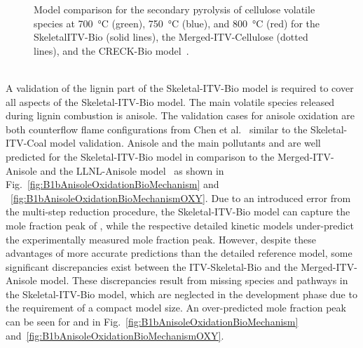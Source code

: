 \begin{refsection}
\begin{figure}[h]
  \hfill
  \hfill
  \caption{Model comparison for the secondary pyrolysis of cellulose volatile species at \SI{700}{\celsius} (green), \SI{750}{\celsius} (blue), and \SI{800}{\celsius} (red) for the SkeletalITV-Bio (solid lines), the Merged-ITV-Cellulose (dotted lines), and the CRECK-Bio model~\cite{Debiagi2016}.}
  \label{fig:B1bCellulosePyrolysisBioMechanism}
\end{figure}
\\
A validation of the lignin part of the Skeletal-ITV-Bio model is required to cover all aspects of the Skeletal-ITV-Bio model. The main volatile species released during lignin combustion is anisole. The validation cases for anisole oxidation are both counterflow flame configurations from Chen et al.~\cite{Chen2022} similar to the Skeletal-ITV-Coal model validation. Anisole and the main pollutants  and  are well predicted for the Skeletal-ITV-Bio model in comparison to the Merged-ITV-Anisole and the LLNL-Anisole model~\cite{Wagnon2018} as shown in Fig.~\ref{fig:B1bAnisoleOxidationBioMechanism} and ~\ref{fig:B1bAnisoleOxidationBioMechanismOXY}. Due to an introduced error from the multi-step reduction procedure, the Skeletal-ITV-Bio model can capture the mole fraction peak of , while the respective detailed kinetic models under-predict the experimentally measured mole fraction peak. However, despite these advantages of more accurate predictions than the detailed reference model, some significant discrepancies exist between the ITV-Skeletal-Bio and the Merged-ITV-Anisole model. These discrepancies result from missing species and pathways in the Skeletal-ITV-Bio model, which are neglected in the development phase due to the requirement of a compact model size. An over-predicted mole fraction peak can be seen for  and  in Fig.~\ref{fig:B1bAnisoleOxidationBioMechanism} and~\ref{fig:B1bAnisoleOxidationBioMechanismOXY}.
\begin{figure}[h]
  \centering
  \hfill
  \hfill
  \hfill

\end{figure}
\end{refsection}
